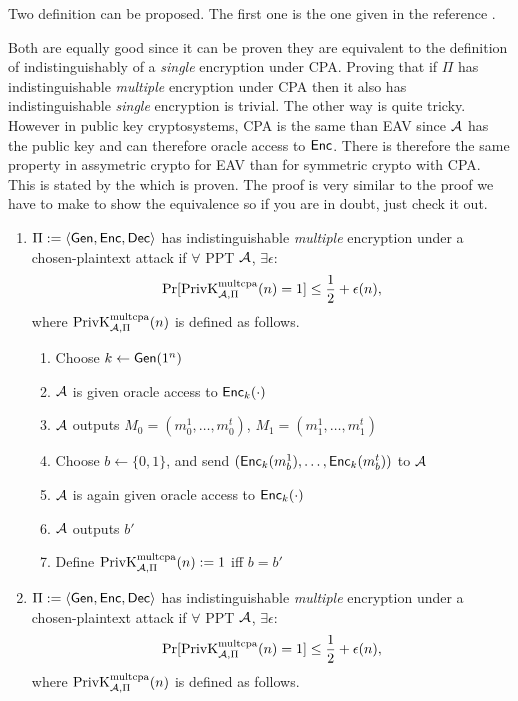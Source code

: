 \begin{solution}
  Two definition can be proposed.
  The first one is the one given in the reference \cite[p.~84]{katz2007introduction}.

  Both are equally good since it can be proven they are equivalent to the definition of indistinguishably of a \emph{single} encryption
  under CPA.
  Proving that if $\Pi$ has indistinguishable \emph{multiple} encryption under CPA then it also has indistinguishable \emph{single} encryption
  is trivial.
  The other way is quite tricky.
  However in public key cryptosystems, CPA is the same than EAV since $\mathcal{A}$ has the public key and can therefore oracle access to $\operatorname{\mathsf{Enc}}$.
  There is therefore the same property in assymetric crypto for EAV than for symmetric crypto with CPA.
  This is stated by the \cite[theorem~10.10]{katz2007introduction} which is proven.
  The proof is very similar to the proof we have to make to show the equivalence so if you are in doubt, just check it out.

  \begin{enumerate}

    \item
      $\Pi := \langle\operatorname{\mathsf{Gen}}, \operatorname{\mathsf{Enc}}, \operatorname{\mathsf{Dec}}\rangle$ has indistinguishable \emph{multiple} encryption under a chosen-plaintext attack
      if $\forall$ PPT $\mathcal{A}$, $\exists \epsilon$:
      \[ \Pr[\operatorname{PrivK}^{\text{multcpa}}_{\mathcal{A},\Pi}(n) = 1] \leq \frac{1}{2} + \epsilon(n), \]
      where $\operatorname{PrivK}^{\text{multcpa}}_{\mathcal{A},\Pi}(n)$ is defined as follows.
      \begin{enumerate}
        \item Choose $k \leftarrow \operatorname{\mathsf{Gen}}(1^n)$
        \item $\mathcal{A}$ is given oracle access to $\operatorname{\mathsf{Enc}}_k(\cdot)$
        \item $\mathcal{A}$ outputs $M_0 = (m_0^1, \ldots, m_0^t)$, $M_1 = (m_1^1, \ldots, m_1^t)$
        \item Choose $b \leftarrow \{0,1\}$, and send $(\operatorname{\mathsf{Enc}}_k(m_b^1), \ldots, \operatorname{\mathsf{Enc}}_k(m_b^t))$ to $\mathcal{A}$
        \item $\mathcal{A}$ is again given oracle access to $\operatorname{\mathsf{Enc}}_k(\cdot)$
        \item $\mathcal{A}$ outputs $b'$
        \item Define $\operatorname{PrivK}^{\text{multcpa}}_{\mathcal{A},\Pi}(n) := 1$ iff $b = b'$
      \end{enumerate}
	

    \item
      $\Pi := \langle\operatorname{\mathsf{Gen}}, \operatorname{\mathsf{Enc}}, \operatorname{\mathsf{Dec}}\rangle$ has indistinguishable \emph{multiple} encryption under a chosen-plaintext attack
      if $\forall$ PPT $\mathcal{A}$, $\exists \epsilon$:
      \[ \Pr[\operatorname{PrivK}^{\text{multcpa}}_{\mathcal{A},\Pi}(n) = 1] \leq \frac{1}{2} + \epsilon(n), \]
      where $\operatorname{PrivK}^{\text{multcpa}}_{\mathcal{A},\Pi}(n)$ is defined as follows.
      

\end{enumerate}
\end{solution}
